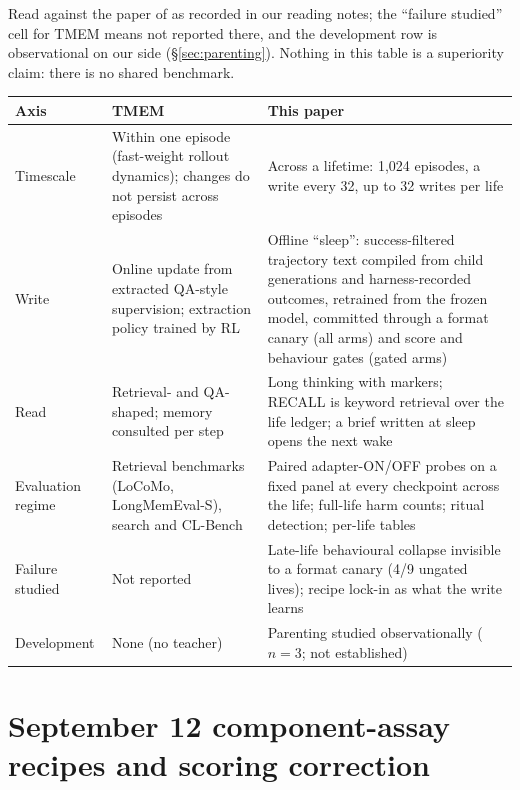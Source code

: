 \documentclass{article}
\begin{document}
Read against the paper of \citet{ren2026tmem} as recorded in our reading notes; the ``failure studied'' cell for TMEM means not reported there, and the development row is observational on our side (\S\ref{sec:parenting}). Nothing in this table is a superiority claim: there is no shared benchmark.
\begin{center}\footnotesize
\begin{tabular}{p{2.4cm}p{5.6cm}p{6.2cm}}
\toprule
Axis & TMEM & This paper \\
\midrule
Timescale & Within one episode (fast-weight rollout dynamics); changes do not persist across episodes & Across a lifetime: 1{,}024 episodes, a write every 32, up to 32 writes per life \\
Write & Online update from extracted QA-style supervision; extraction policy trained by RL & Offline ``sleep'': success-filtered trajectory text compiled from child generations and harness-recorded outcomes, retrained from the frozen model, committed through a format canary (all arms) and score and behaviour gates (gated arms) \\
Read & Retrieval- and QA-shaped; memory consulted per step & Long thinking with markers; RECALL is keyword retrieval over the life ledger; a brief written at sleep opens the next wake \\
Evaluation regime & Retrieval benchmarks (LoCoMo, LongMemEval-S), search and CL-Bench & Paired adapter-ON/OFF probes on a fixed panel at every checkpoint across the life; full-life harm counts; ritual detection; per-life tables \\
Failure studied & Not reported & Late-life behavioural collapse invisible to a format canary (4/9 ungated lives); recipe lock-in as what the write learns \\
Development & None (no teacher) & Parenting studied observationally ($n = 3$; not established) \\
\bottomrule
\end{tabular}
\end{center}

\section{September 12 component-assay recipes and scoring correction}
\label{app:components}
\end{document}
